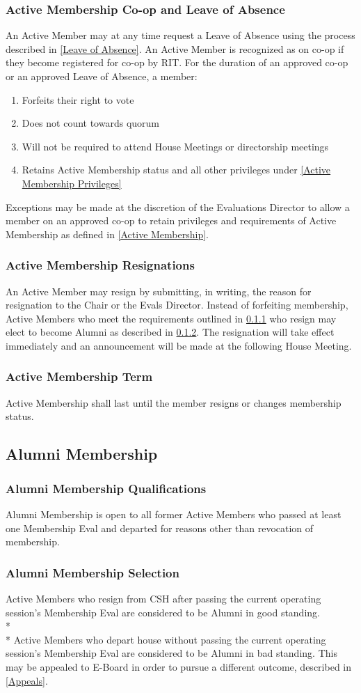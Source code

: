 \documentclass{article}
\newcommand{\asection}[1]{\subsection{#1} \label{#1}}
\newcommand{\asubsection}[1]{\subsubsection{#1} \label{#1}}
\begin{document}
\asubsection{Active Membership Co-op and Leave of Absence}
\renewcommand{\theenumi}{\alph{enumi}} %

An Active Member may at any time request a Leave of Absence using the process described in \ref{Leave of Absence}.
An Active Member is recognized as on co-op if they become registered for co-op by RIT.
For the duration of an approved co-op or an approved Leave of Absence, a member:
\begin{enumerate}
	\item Forfeits their right to vote
	\item Does not count towards quorum
	\item Will not be required to attend House Meetings or directorship meetings
	\item Retains Active Membership status and all other privileges under \ref{Active Membership Privileges}
\end{enumerate}
Exceptions may be made at the discretion of the Evaluations Director to allow a member on an approved co-op to retain privileges and requirements of Active Membership as defined in \ref{Active Membership}.

\asubsection{Active Membership Resignations}
An Active Member may resign by submitting, in writing, the reason for resignation to the Chair or the Evals Director.
Instead of forfeiting membership, Active Members who meet the requirements outlined in \ref{Alumni Membership Qualifications} who resign may elect to become Alumni as described in \ref{Alumni Membership Selection}.
The resignation will take effect immediately and an announcement will be made at the following House Meeting.

\asubsection{Active Membership Term}
Active Membership shall last until the member resigns or changes membership status.

\asection{Alumni Membership}

\asubsection{Alumni Membership Qualifications}
Alumni Membership is open to all former Active Members who passed at least one Membership Eval and departed for reasons other than revocation of membership.

\asubsection{Alumni Membership Selection}
Active Members who resign from CSH after passing the current operating session's Membership Eval are considered to be Alumni in good standing.
\\*\\*
Active Members who depart house without passing the current operating session's Membership Eval are considered to be Alumni in bad standing.
This may be appealed to E-Board in order to pursue a different outcome, described in \ref{Appeals}.
\end{document}
